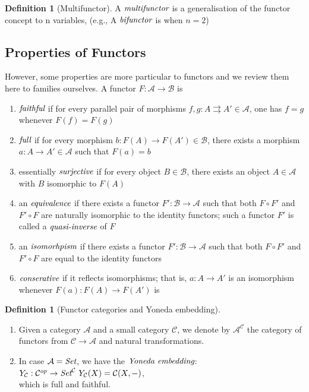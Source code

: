 \documentclass[10pt, oneside, reqno]{amsart}
\theoremstyle{plain}%
\theoremstyle{definition}
\newtheorem{defn}[thm]{Definition}
\theoremstyle{remark}
\begin{document}
\begin{defn}[Multifunctor]
 A $\emph{multifunctor}$ is a generalisation of the functor concept to n variables, (e.g., A $\emph{bifunctor}$ is when $n=2$)
\end{defn}

\subsection{Properties of Functors} %
\label{subsec:functorsproperties}
However, some properties are more particular to functors and we review them here to families ourselves.
A functor $F : \mathcal{A} \to \mathcal{B}$ is
\begin{enumerate}
 \item $\emph{faithful}$ if for every parallel pair of morphisms $f,g : A \rightrightarrows A' \in \mathcal{A}$, one has $f = g$ whenever $F(f) = F(g)$
 \item $\emph{full}$ if for every morphism $b: F(A) \to F(A') \in \mathcal{B}$, there exists a morphism $a: A \to A' \in \mathcal{A}$ such that $F(a) = b$
 \item essentially $\emph{surjective}$ if for every object $B \in \mathcal{B}$, there exists an object $A \in \mathcal{A}$ with $B$ isomorphic to $F(A)$
 \item an $\emph{equivalence}$ if there exists a functor $F': \mathcal{B} \to \mathcal{A}$ such that both $F \circ F'$ and $F' \circ F$ are naturally
 isomorphic to the identity functors; such a functor $F'$ is called a $\emph{quasi-inverse}$ of $F$
 \item an $\emph{isomorhpism}$ if there exists a functor $F': \mathcal{B} \to \mathcal{A}$ such that both $F \circ F'$ and $F' \circ F$
 are equal to the identity functors
 \item $\emph{conserative}$ if it reflects isomorphisms; that is, $a: A \to A'$ is an isomorphism whenever $F(a): F(A) \to F(A')$ is
\end{enumerate}

\begin{defn}[Functor categories and Yoneda embedding]

 \begin{enumerate}
  \item Given a category $\mathcal{A}$ and a small category $\mathcal{C}$, we denote by
  $\mathcal{A}^\mathcal{C}$ the category of functors from $\mathcal{C} \to \mathcal{A}$ and natural transformations.
  \item In case $\mathcal{A} = \emph{Set}$, we have the $\emph{Yoneda embedding}$:\\
  $Y_{\mathcal{C}}: \mathcal{C}^{op} \to \emph{Set}^{\mathcal{C}}
  \, \,
  Y_{\mathcal{C}}(X) = \mathcal{C}(X, -)$,\\
  which is full and faithful.
 \end{enumerate}
\end{defn}
\end{document}
